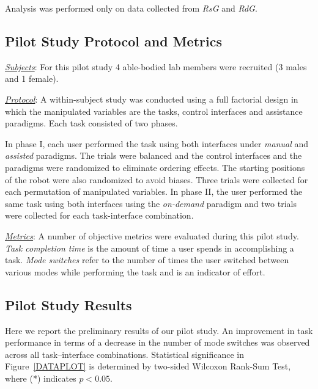 \documentclass[conference]{IEEEtran}
\begin{document}
Analysis was performed only on data collected from \textit{RsG} and \textit{RdG}. 


\subsection{Pilot Study Protocol and Metrics}
\noindent\underline{\textit{Subjects}}: For this pilot study 4 able-bodied lab members were recruited (3 males and 1 female). 

\noindent\underline{\textit{Protocol}}:
A within-subject study was conducted using a full factorial design in which the manipulated variables are the tasks, control interfaces and assistance paradigms. Each task consisted of two phases. 

In phase I, each user performed the task using both interfaces under \textit{manual} and \textit{assisted} paradigms. The trials were balanced and the control interfaces and the paradigms were randomized to eliminate ordering effects. The starting positions of the robot were also randomized to avoid biases. Three trials were collected for each permutation of manipulated variables. 
In phase II, the user performed the same task using both interfaces using the \textit{on-demand} paradigm and two trials were collected for each task-interface combination.  

\noindent\underline{\textit{Metrics}}: A number of objective metrics were evaluated during this pilot study. \textit{Task completion time} is the amount of time a user spends in accomplishing a task. \textit{Mode switches} refer to the number of times the user switched between various modes while performing the task and is an indicator of effort. 


\subsection{Pilot Study Results}\label{RES}
Here we report the preliminary results of our pilot study. An improvement in task performance in terms of a decrease in the number of mode switches was observed across all task--interface combinations. Statistical significance in Figure~\ref{DATAPLOT} is determined by two-sided Wilcoxon Rank-Sum Test, where (*) indicates $p < 0.05$.
\end{document}
